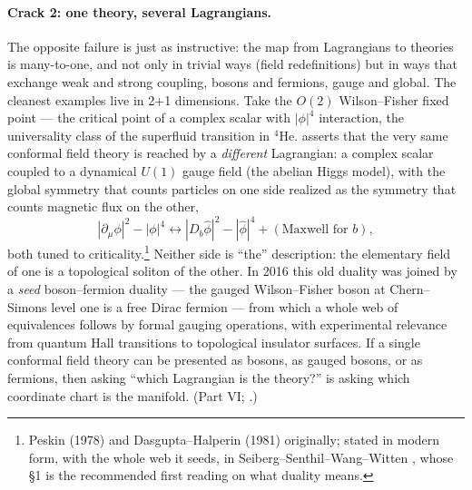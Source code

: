 \paragraph{Crack 2: one theory, several Lagrangians.}
The opposite failure is just as instructive: the map from Lagrangians to
theories is many-to-one, and not only in trivial ways (field redefinitions) but
in ways that exchange weak and strong coupling, bosons and fermions, gauge and
global. The cleanest examples live in 2+1 dimensions. Take the $O(2)$
Wilson--Fisher fixed point --- the critical point of a complex scalar with
$|\phi|^4$ interaction, the universality class of the superfluid transition in
$^4$He.  asserts that the very same conformal
field theory is reached by a \emph{different} Lagrangian: a complex scalar
coupled to a dynamical $U(1)$ gauge field (the abelian Higgs model), with the
global symmetry that counts particles on one side realized as the symmetry that
counts magnetic flux on the other,
\begin{equation}
|\partial_\mu \phi|^2 - |\phi|^4
\longleftrightarrow
|D_b \hat\phi|^2 - |\hat\phi|^4 + (\text{Maxwell for } b),
\label{eq:particle-vortex}
\end{equation}
both tuned to criticality.\footnote{Peskin (1978) and Dasgupta--Halperin (1981)
originally; stated in modern form, with the whole web it seeds, in
Seiberg--Senthil--Wang--Witten , whose \S1 is the recommended
first reading on what duality means.} Neither side is ``the'' description: the
elementary field of one is a topological soliton of the other. In 2016 this old
duality was joined by a \emph{seed} boson--fermion duality --- the gauged
Wilson--Fisher boson at Chern--Simons level one is a free Dirac fermion --- from
which a whole web of equivalences follows by formal gauging operations, with
experimental relevance from quantum Hall transitions to topological insulator
surfaces. If a single conformal field theory can be presented as bosons, as
gauged bosons, or as fermions, then asking ``which Lagrangian is the theory?''
is asking which coordinate chart is the manifold. (Part VI;
.)

